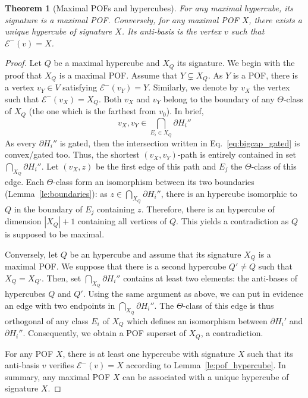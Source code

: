 \documentclass{article}
\newtheorem{theorem}{Theorem}
\newcommand{\card}[1]{\left| #1 \right|}
\begin{document}
\begin{theorem}[Maximal POFs and hypercubes]
For any maximal hypercube, its signature is a maximal POF.
Conversely, for any maximal POF $X$, there exists a unique hypercube of signature $X$. Its anti-basis is the vertex $v$ such that $\mathcal{E}^-(v) = X$. 
\label{th:maximal_pofs}
\end{theorem}
\begin{proof}
Let $Q$ be a maximal hypercube and $X_Q$ its signature. We begin with the proof that $X_Q$ is a maximal POF. Assume that $Y \subsetneq X_Q$. As $Y$ is a POF, there is a vertex $v_Y \in V$ satisfying $\mathcal{E}^-(v_Y) = Y$. Similarly, we denote by $v_X$ the vertex such that $\mathcal{E}^-(v_X) = X_Q$. Both $v_X$ and $v_Y$ belong to the boundary of any $\Theta$-class of $X_Q$ (the one which is the farthest from $v_0$). In brief, 
\begin{equation}v_X,v_Y \in \bigcap_{E_i \in X_Q} \partial H_i''
\label{eq:bigcap_gated}
\end{equation}
As every $\partial H_i''$ is gated, then the intersection written in Eq.~\eqref{eq:bigcap_gated} is convex/gated too. Thus, the shortest $(v_X,v_Y)$-path is entirely contained in set $\bigcap_{X_Q} \partial H_i''$. Let $(v_X,z)$ be the first edge of this path and $E_j$ the $\Theta$-class of this edge. Each $\Theta$-class form an isomorphism between its two boundaries (Lemma~\ref{le:boundaries}): as $z \in \bigcap_{X_Q} \partial H_i''$, there is an hypercube isomorphic to $Q$ in the boundary of $E_j$ containing $z$. Therefore, there is an hypercube of dimension $\card{X_Q}+1$ containing all vertices of $Q$. This yields a contradiction as $Q$ is supposed to be maximal.

Conversely, let $Q$ be an hypercube and assume that its signature $X_Q$ is a maximal POF. We suppose that there is a second hypercube $Q' \neq Q$ such that $X_Q = X_{Q'}$. Then, set $\bigcap_{X_Q} \partial H_i''$ contains at least two elements: the anti-bases of hypercubes $Q$ and $Q'$. Using the same argument as above, we can put in evidence an edge with two endpoints in $\bigcap_{X_Q} \partial H_i''$. The $\Theta$-class of this edge is thus orthogonal of any class $E_i$ of $X_Q$ which defines an isomorphism between $\partial H_i'$ and $\partial H_i''$. Consequently, we obtain a POF superset of $X_Q$, a contradiction.

For any POF $X$, there is at least one hypercube with signature $X$ such that its anti-basis $v$ verifies $\mathcal{E}^-(v) = X$ according to Lemma~\ref{le:pof_hypercube}. In summary, any maximal POF $X$ can be associated with a unique hypercube of signature $X$.
\end{proof}
\end{document}
